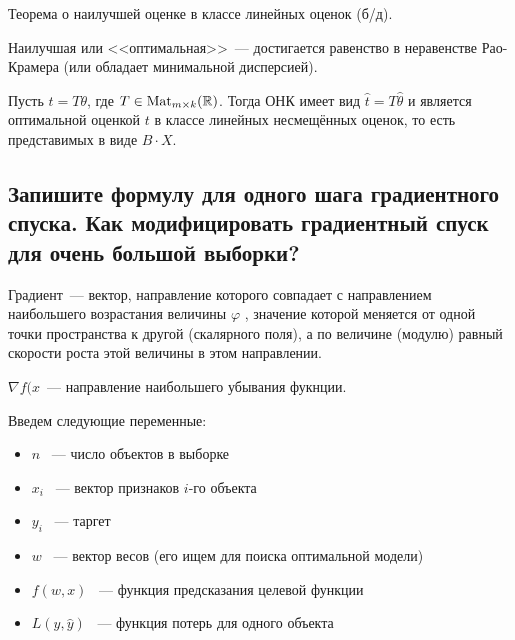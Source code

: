 \begin{theorem}
    Теорема о наилучшей оценке в классе линейных оценок (б/д).
\end{theorem}
\begin{note}
    Наилучшая или <<оптимальная>>~--- достигается равенство в неравенстве Рао-Крамера (или обладает минимальной дисперсией).
\end{note}

\begin{theorem}
    Пусть $t = T\theta$, где $T \in \text{Mat}_{m \times k}(\mathbb{R})$. Тогда ОНК имеет вид $\hat{t} = T\hat{\theta}$ и является оптимальной оценкой $t$ в классе линейных несмещённых оценок, то есть представимых в виде $B\cdot X$.
\end{theorem}





\subsection{Запишите формулу для одного шага градиентного спуска. Как модифицировать градиентный спуск для очень большой выборки?}
\begin{definition}
    Градиент~--- вектор, направление которого совпадает с направлением наибольшего возрастания величины $\varphi$ , значение которой меняется от одной точки пространства к другой (скалярного поля), а по величине (модулю) равный скорости роста этой величины в этом направлении.
\end{definition}

\begin{note}
    $\nabla f(x$~--- направление наибольшего убывания фукнции.
\end{note}

Введем следующие переменные:

\begin{itemize}
    \item $n$ ~--- число объектов в выборке
    \item $x_i$ ~--- вектор признаков $i$-го объекта
    \item $y_i$ ~--- таргет
    \item $w$ ~--- вектор весов (его ищем для поиска оптимальной модели)
    \item $f(w,x)$ ~--- функция предсказания целевой функции
    \item $L(y, \hat{y})$ ~--- функция потерь для одного объекта
\end{itemize}

